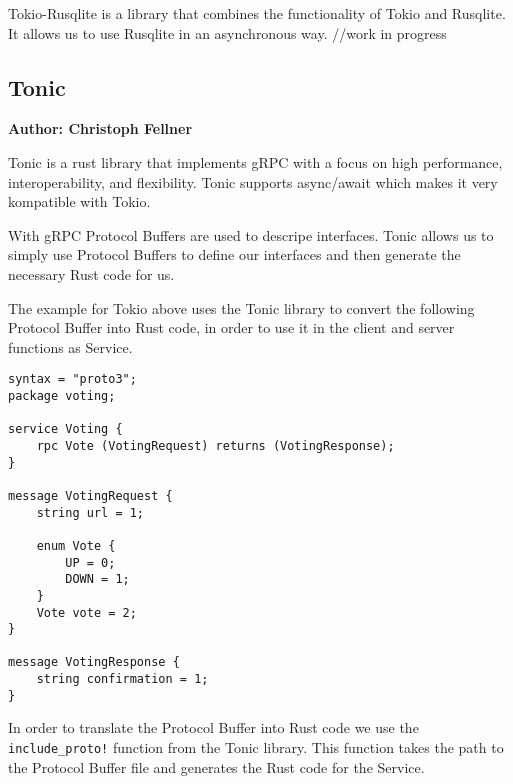 Tokio-Rusqlite is a library that combines the functionality of Tokio and Rusqlite. It allows us to use Rusqlite in an asynchronous way. //work in progress

\subsection{Tonic}
\textbf{Author: Christoph Fellner}

Tonic is a rust library that implements gRPC with a focus on high performance, interoperability, and flexibility. Tonic supports async/await which makes it very kompatible with Tokio.

With gRPC Protocol Buffers are used to descripe interfaces. Tonic allows us to simply use Protocol Buffers to define our interfaces and then generate the necessary Rust code for us.

The example for Tokio above uses the Tonic library to convert the following Protocol Buffer into Rust code, in order to use it in the client and server functions as Service.

\begin{verbatim}
syntax = "proto3";
package voting;
        
service Voting {
    rpc Vote (VotingRequest) returns (VotingResponse);
}
        
message VotingRequest {
    string url = 1;
        
    enum Vote {
        UP = 0;
        DOWN = 1;
    }
    Vote vote = 2;    
}
        
message VotingResponse {
    string confirmation = 1;
}
\end{verbatim}

In order to translate the Protocol Buffer into Rust code we use the \verb+include_proto!+ function from the Tonic library. This function takes the path to the Protocol Buffer file and generates the Rust code for the Service.

\filbreak